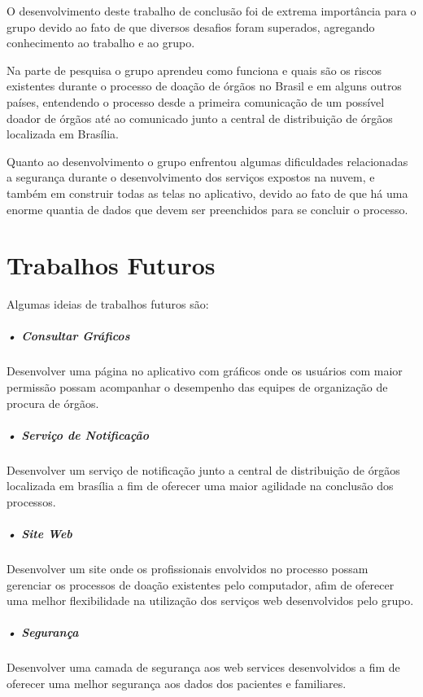 \documentclass[portuguese,oneside]{tcc}
\begin{document}
O desenvolvimento deste trabalho de conclusão foi de extrema importância para o grupo devido ao fato de que diversos desafios foram superados, agregando conhecimento ao trabalho e ao grupo.

Na parte de pesquisa o grupo aprendeu como funciona e quais são os riscos existentes durante o processo de doação de órgãos no Brasil e em alguns outros países, entendendo o processo desde a primeira comunicação de um possível doador de órgãos até ao comunicado junto a central de distribuição de órgãos localizada em Brasília.

Quanto ao desenvolvimento o grupo enfrentou algumas dificuldades relacionadas a segurança durante o desenvolvimento dos serviços expostos na nuvem, e também em construir todas as telas no aplicativo, devido ao fato de que há uma enorme quantia de dados que devem ser preenchidos para se concluir o processo.

\section{Trabalhos Futuros}
Algumas ideias de trabalhos futuros são:

\subparagraph{• Consultar Gráficos}
Desenvolver uma página no aplicativo com gráficos onde os usuários com maior permissão possam acompanhar o desempenho das equipes de organização de procura de órgãos.

\subparagraph{• Serviço de Notificação}
Desenvolver um serviço de notificação junto a central de distribuição de órgãos localizada em brasília a fim de oferecer uma maior agilidade na conclusão dos processos.

\subparagraph{• Site Web}
Desenvolver um site onde os profissionais envolvidos no processo possam gerenciar os processos de doação existentes pelo computador, afim de oferecer uma melhor flexibilidade na utilização dos serviços web desenvolvidos pelo grupo.

\subparagraph{• Segurança}
Desenvolver uma camada de segurança aos web services desenvolvidos a fim de oferecer uma melhor segurança aos dados dos pacientes e familiares.









\end{document}
